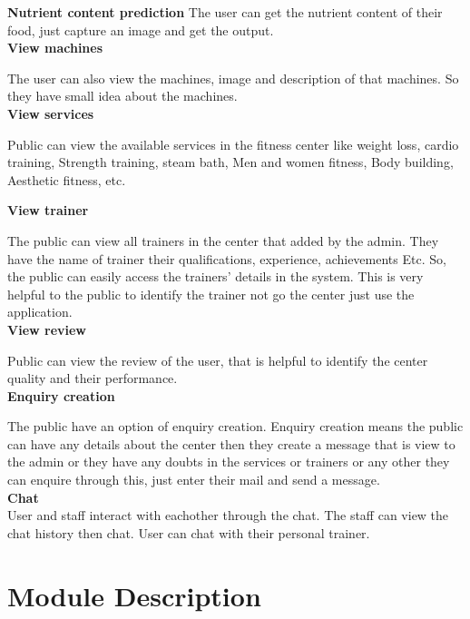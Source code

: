 \documentclass[a4paper,12pt,toc=flat]{report}
\begin{document}
{			{\bf \hspace{-20pt} Nutrient content prediction}
			The user can get the nutrient content of their food, just capture an image and get the output.\\

	

	{\bf \hspace{-20pt} View machines}
	
	The user can also view the machines, image and description of that machines. So they have small idea about the machines.
	\\
	{\bf \hspace{-20pt}View services}
	
	Public can view the available services in the fitness center like weight loss, cardio training, Strength training, steam bath, Men and women fitness, Body building, Aesthetic fitness, etc.
	
	{\bf \hspace{-20pt}View trainer}
	
	The public can view all trainers in the center that added by the admin.  They have the name of trainer their qualifications, experience, achievements Etc. So, the public can easily access the trainers’ details in the system. This is very helpful to the public to identify the trainer not go the center just use the application. 	\pagebreak
	\\
	{\bf \hspace{-20pt}View review}
	
	Public can view the review of the user, that is helpful to identify the center quality and their performance. 
	\\

	{\bf \hspace{-20pt}Enquiry creation}
	
	The public have an option of enquiry creation.  Enquiry creation means the public can have any details about the center then they create a message that is view to the admin or they have any doubts in the services or trainers or any other they can enquire through this, just enter their mail and send a message.
	\\
		{\bf \hspace{-20pt}Chat}\\
		User and staff interact with eachother through the chat. The staff can view the chat history then chat. User can chat with their personal trainer.\\
	\pagebreak
	\section{Module Description}
}
\end{document}
